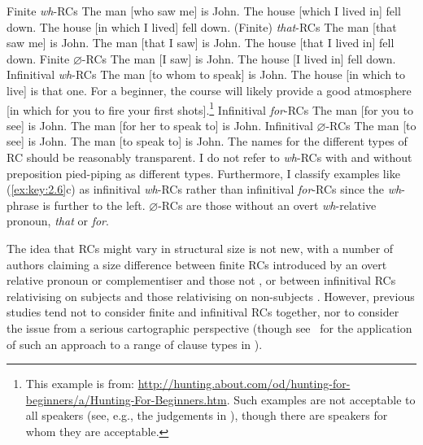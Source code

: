 \documentclass[output=paper]{langsci/langscibook}
\begin{document}
\ea\label{ex:key:2.3} Finite \emph{wh}-\glspl{RC}
    \ea    The man [who saw me] is John.
    \ex    The house [which I lived in] fell down.
    \ex    The house [in which I lived] fell down.
    \z
\z
\ea\label{ex:key:2.4} (Finite) \emph{that}-\glspl{RC}
    \ea    The man [that saw me] is John.
    \ex    The man [that I saw] is John.
    \ex    The house [that I lived in] fell down.
    \z
\z
\ea\label{ex:key:2.5} Finite $\varnothing$-\glspl{RC}
    \ea    The man [I saw] is John.
    \ex    The house [I lived in] fell down.
    \z
\z
\ea\label{ex:key:2.6} Infinitival \emph{wh}-\glspl{RC}
    \ea    The man [to whom to speak] is John.
    \ex    The house [in which to live] is that one.
    \ex    For a beginner, the course will likely provide a good atmosphere [in
        which for you to fire your first shots].\footnote{This example is from:
        \url{http://hunting.about.com/od/hunting-for-beginners/a/Hunting-For-Beginners.htm}.
        Such examples are not acceptable to all speakers (see, e.g., the
        judgements in \citealt{ChomskyLasnik1977,Huddleston2002}), though there
        are speakers for whom they are acceptable.}
    \z
\z
\ea\label{ex:key:2.7} Infinitival \emph{for}-\glspl{RC}
    \ea    The man [for you to see] is John.
    \ex    The man [for her to speak to] is John.
    \z
\z
\ea\label{ex:key:2.8} Infinitival $\varnothing$-\glspl{RC}
    \ea    The man [to see] is John.
    \ex    The man [to speak to] is John.
    \z
\z
The names for the different types of \gls{RC} should be reasonably transparent. I do
not refer to \emph{wh}-\glspl{RC} with and without preposition pied-piping as
different types. Furthermore, I classify examples like (\ref{ex:key:2.6}c) as infinitival
\emph{wh}-\glspl{RC} rather than infinitival \emph{for}-\glspl{RC} since the
\emph{wh}-phrase is further to the left. $\varnothing${-\glspl{RC} are those without an
overt} \emph{wh}{-relative pronoun,} \emph{that} or \emph{for}.

The idea that \glspl{RC} might vary in structural size is not new, with a number of
authors claiming a size difference between finite \glspl{RC} introduced by an overt
relative pronoun or complementiser and those not \parencite{Boskovic1994,Boskovic1996,%
Boskovic1997,Boskovic2016,Weisler1980,Doherty1993,Doherty2000},
or between infinitival \glspl{RC} relativising on subjects and those
relativising on non-subjects \citep{Bhatt1999}. However, previous studies tend
not to consider finite and infinitival \glspl{RC} together, nor to consider the
issue from a serious cartographic perspective (though
see~\citealt{Haegeman2012} for the application of such an approach to a range
of clause types in ).
\end{document}
